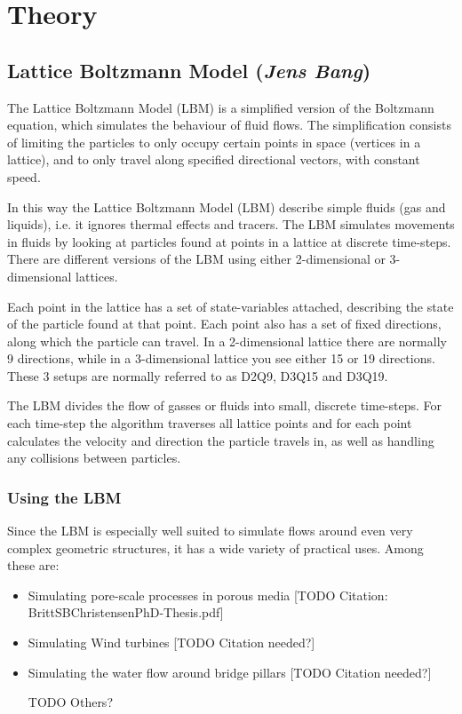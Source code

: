 \section{Theory}

\subsection{Lattice Boltzmann Model (\textit{Jens Bang})}
The Lattice Boltzmann Model (LBM) is a simplified version of the Boltzmann equation, which simulates the behaviour of fluid flows. The simplification consists of limiting the particles to only occupy certain points in space (vertices in a lattice), and to only travel along specified directional vectors, with constant speed. 

In this way the Lattice Boltzmann Model (LBM) describe simple fluids (gas and liquids), i.e. it ignores thermal effects and tracers. The LBM simulates movements in fluids by looking at particles found at points in a lattice at discrete time-steps. There are different versions of the LBM using either 2-dimensional or 3-dimensional lattices.

Each point in the lattice has a set of state-variables attached, describing the state of the particle found at that point. Each point also has a set of fixed directions, along which the particle can travel. In a 2-dimensional lattice there are normally 9 directions, while in a 3-dimensional lattice you see either 15 or 19 directions. These 3 setups are normally referred to as D2Q9, D3Q15 and D3Q19.


The LBM divides the flow of gasses or fluids into small, discrete time-steps. For each time-step the algorithm traverses all lattice points and for each point calculates the velocity and direction the particle travels in, as well as handling any collisions between particles.

\subsubsection{Using the LBM}
Since the LBM is especially well suited to simulate flows around even very complex geometric structures, it has a wide variety of practical uses. Among these are:
\begin{itemize}
\item Simulating pore-scale processes in porous media [TODO Citation: BrittSBChristensenPhD-Thesis.pdf]
\item Simulating Wind turbines [TODO Citation needed?]
\item Simulating the water flow around bridge pillars [TODO Citation needed?]
\item [TODO Others?]
\end{itemize}

